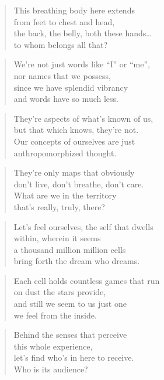 \documentclass[10pt,a4paper]{article}
\begin{document}
\begin{multicols}{2}
\begin{verse}
This breathing body here extends\\
from feet to chest and head,\\
the back, the belly, both these hands…\\
to whom belongs all that?
\end{verse}

\begin{verse}
We’re not just words like “I” or “me”,\\
nor names that we possess,\\
since we have splendid vibrancy\\
and words have so much less.
\end{verse}

\begin{verse}
They’re aspects of what’s known of us,\\
but that which knows, they’re not.\\
Our concepts of ourselves are just\\
anthropomorphized thought.
\end{verse}

\begin{verse}
They’re only maps that obviously\\
don’t live, don’t breathe, don’t care.\\
What are we in the territory\\
that’s really, truly, there?
\end{verse}

\begin{verse}
Let’s feel ourselves, the self that dwells\\
within, wherein it seems\\
a thousand million million cells\\
bring forth the dream who dreams.
\end{verse}

\begin{verse}
Each cell holds countless games that run\\
on dust the stars provide,\\
and still we seem to us just one\\
we feel from the inside.
\end{verse}

\begin{verse}
Behind the senses that perceive\\
this whole experience,\\
let’s find who’s in here to receive.\\
Who is its audience?
\end{verse}


\end{multicols}
\end{document}

